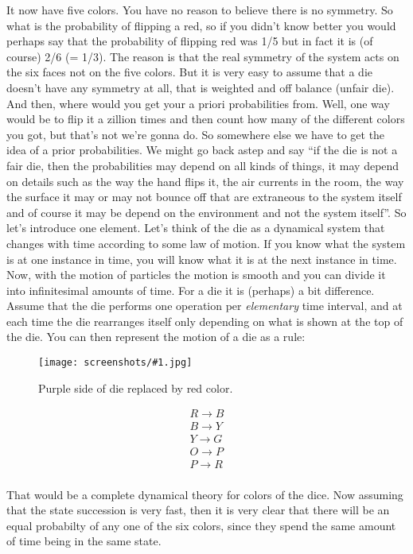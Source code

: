 \documentclass[a4, 12pt, english, USenglish]{scrreprt}
\newcommand{\screenshot}[2]{
\begin{figure}[htb]
\texttt{[image: screenshots/\#1.jpg]}
\label{#1}
\caption{#2}
\end{figure}}
\newcommand{\idx}[1]{{\em #1}\index{#1}}
\begin{document}
It now have five colors.  You have no reason to believe there is no
symmetry.  So what is the probability of flipping a red, so if you
didn't know better you would perhaps say that the probability of
flipping red was 1/5 but in fact it is (of course) 2/6 (= 1/3).  The
reason is that the real symmetry of the system acts on the six faces
not on the five colors.  But it is very easy to assume that a die
doesn't have any symmetry at all, that is weighted and off balance
(unfair die).  And then, where would you get your a priori
probabilities from.  Well, one way would be to flip it a zillion times
and then count how many of the different colors you got, but that's
not we're gonna do.  So somewhere else we have to get the idea of a
prior probabilities.  We might go back astep and say ``if the die is
not a fair die, then the probabilities may depend on all kinds of
things, it may depend on details such as the way the hand flips it,
the air currents in the room, the way the surface it may or may not
bounce off that are extraneous to the system itself and of course it
may be depend on the environment and not the system itself''.  So
let's introduce one element.  Let's think of the die as a dynamical
system that changes with time according to some law of motion.  If you
know what the system is at one instance in time, you will know what it
is at the next instance in time.  Now, with the motion of particles
the motion is smooth and you can divide it into infinitesimal amounts
of time. For a die it is (perhaps) a bit difference.  Assume that the
die performs one operation per \idx{elementary} time interval, and
at each time the die rearranges itself only depending on what is shown
at the top of the die.   You can then represent the motion of a  die
as a rule:

\screenshot{dynamictheory}{Purple side of die replaced by red color.}

\[
\begin{array}{lcl}
R \rightarrow B \\
B \rightarrow Y\\
Y \rightarrow G\\
O \rightarrow P\\
P \rightarrow R\\
\end{array}
\]

That would be a complete dynamical theory for colors of the dice.
Now assuming that the state succession is very fast, then it is very
clear that there will be an equal probabilty of any one of the six
colors, since they spend the same amount of time being in the same
state.
\end{document}
